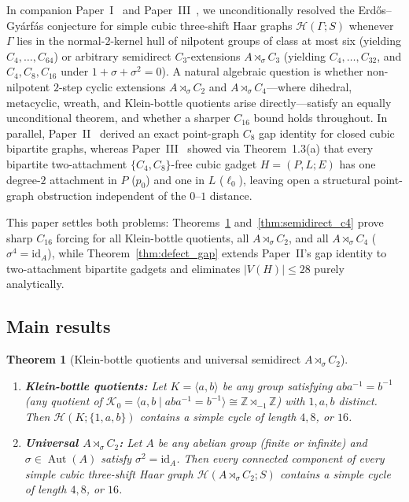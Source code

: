 \documentclass[11pt]{amsart}
\newtheorem{theorem}{Theorem}[section]
\theoremstyle{definition}
\theoremstyle{remark}
\newcommand{\Z}{\mathbb{Z}}
\newcommand{\Haar}{\mathcal{H}}
\newcommand{\Aut}{\operatorname{Aut}}
\newcommand{\id}{\mathrm{id}}
\begin{document}
In companion Paper~I~\cite{Paper1} and Paper~III~\cite{Paper3}, we unconditionally resolved the Erd\H{o}s--Gy\'arf\'as conjecture for simple cubic three-shift Haar graphs $\Haar(\Gamma; S)$ whenever $\Gamma$ lies in the normal-$2$-kernel hull of nilpotent groups of class at most six (yielding $C_4, \dots, C_{64}$) or arbitrary semidirect $C_3$-extensions $A \rtimes_\sigma C_3$ (yielding $C_4, \dots, C_{32}$, and $C_4, C_8, C_{16}$ under $1 + \sigma + \sigma^2 = 0$). A natural algebraic question is whether non-nilpotent $2$-step cyclic extensions $A \rtimes_\sigma C_2$ and $A \rtimes_\sigma C_4$---where dihedral, metacyclic, wreath, and Klein-bottle quotients arise directly---satisfy an equally unconditional theorem, and whether a sharper $C_{16}$ bound holds throughout. In parallel, Paper~II~\cite{Paper2} derived an exact point-graph $C_8$ gap identity for closed cubic bipartite graphs, whereas Paper~III~\cite{Paper3} showed via Theorem~1.3(a) that every bipartite two-attachment $\{C_4, C_8\}$-free cubic gadget $H = (P, L; E)$ has one degree-$2$ attachment in $P$ ($p_0$) and one in $L$ ($\ell_0$), leaving open a structural point-graph obstruction independent of the $0\text{--}1$ distance.

This paper settles both problems: Theorems~\ref{thm:klein_c2} and~\ref{thm:semidirect_c4} prove sharp $C_{16}$ forcing for all Klein-bottle quotients, all $A \rtimes_\sigma C_2$, and all $A \rtimes_\sigma C_4$ ($\sigma^4 = \id_A$), while Theorem~\ref{thm:defect_gap} extends Paper~II's gap identity to two-attachment bipartite gadgets and eliminates $|V(H)| \le 28$ purely analytically.

\subsection{Main results}

\begin{theorem}[Klein-bottle quotients and universal semidirect $A \rtimes_\sigma C_2$]\label{thm:klein_c2}
\leavevmode
\begin{enumerate}[label=(\alph*)]
\item \textbf{Klein-bottle quotients:} Let $K = \langle a, b \rangle$ be any group satisfying $a b a^{-1} = b^{-1}$ (any quotient of $\mathcal{K}_0 = \langle a, b \mid a b a^{-1} = b^{-1} \rangle \cong \Z \rtimes_{-1} \Z$) with $1, a, b$ distinct. Then $\Haar(K; \{1, a, b\})$ contains a simple cycle of length $4, 8$, or $16$.
\item \textbf{Universal $A \rtimes_\sigma C_2$:} Let $A$ be any abelian group (finite or infinite) and $\sigma \in \Aut(A)$ satisfy $\sigma^2 = \id_A$. Then every connected component of every simple cubic three-shift Haar graph $\Haar(A \rtimes_\sigma C_2; S)$ contains a simple cycle of length $4, 8$, or $16$.
\end{enumerate}
\end{theorem}
\end{document}
